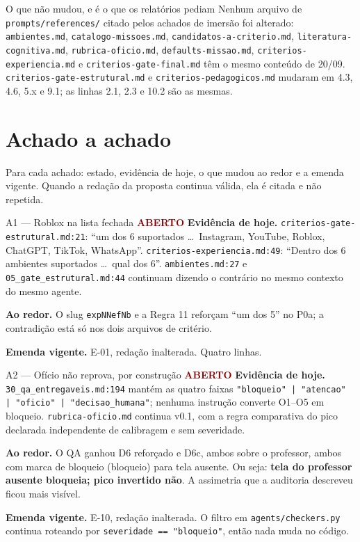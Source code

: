 \documentclass[11pt,a4paper]{article}
\newcommand{\aberto}{\textcolor{DarkRed}{\textbf{ABERTO}}}
\begin{document}
\begin{notabox}{O que não mudou, e é o que os relatórios pediam}
Nenhum arquivo de \texttt{prompts/references/} citado pelos achados de imersão foi alterado:
\texttt{ambientes.md}, \texttt{catalogo-missoes.md}, \texttt{candidatos-a-criterio.md},
\texttt{literatura-cognitiva.md}, \texttt{rubrica-oficio.md}, \texttt{defaults-missao.md},
\texttt{criterios-experiencia.md} e \texttt{criterios-gate-final.md} têm o mesmo conteúdo de 20/09.
\texttt{criterios-gate-estrutural.md} e \texttt{criterios-pedagogicos.md} mudaram em 4.3, 4.6, 5.x e
9.1; as linhas 2.1, 2.3 e 10.2 são as mesmas.
\end{notabox}

\section{Achado a achado}

Para cada achado: estado, evidência de hoje, o que mudou ao redor e a emenda vigente. Quando a
redação da proposta continua válida, ela é citada e não repetida.

\begin{achadobox}{A1 --- Roblox na lista fechada \hfill \aberto}
\textbf{Evidência de hoje.} \texttt{criterios-gate-estrutural.md:21}: ``um dos 6 suportados
\dots\ Instagram, YouTube, Roblox, ChatGPT, TikTok, WhatsApp''. \texttt{criterios-experiencia.md:49}:
``Dentro dos 6 ambientes suportados \dots\ qual dos 6''. \texttt{ambientes.md:27} e
\texttt{05\_gate\_estrutural.md:44} continuam dizendo o contrário no mesmo contexto do mesmo agente.

\textbf{Ao redor.} O slug \texttt{expNNefNb} e a Regra 11 reforçam ``um dos 5'' no P0a; a
contradição está só nos dois arquivos de critério.

\textbf{Emenda vigente.} E-01, redação inalterada. Quatro linhas.
\end{achadobox}

\begin{achadobox}{A2 --- Ofício não reprova, por construção \hfill \aberto}
\textbf{Evidência de hoje.} \texttt{30\_qa\_entregaveis.md:194} mantém as quatro faixas
\texttt{"bloqueio" | "atencao" | "oficio" | "decisao\_humana"}; nenhuma instrução converte O1--O5 em
bloqueio. \texttt{rubrica-oficio.md} continua v0.1, com a regra comparativa do pico declarada
independente de calibragem e sem severidade.

\textbf{Ao redor.} O QA ganhou D6 reforçado e D6c, ambos sobre o professor, ambos com marca de bloqueio
(bloqueio) para tela ausente. Ou seja: \textbf{tela do professor ausente bloqueia; pico invertido não}.
A assimetria que a auditoria descreveu ficou mais visível.

\textbf{Emenda vigente.} E-10, redação inalterada. O filtro em \texttt{agents/checkers.py} continua
roteando por \texttt{severidade == "bloqueio"}, então nada muda no código.
\end{achadobox}
\end{document}
